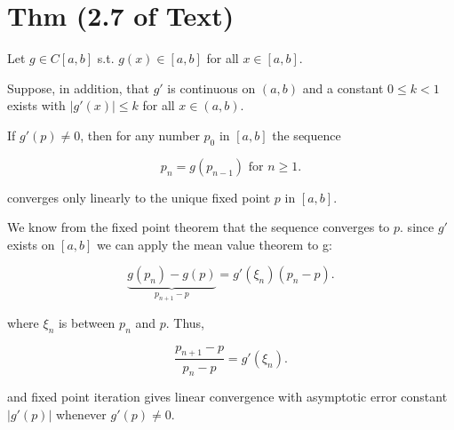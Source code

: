 \documentclass[12pt]{article}
\begin{document}
\section{Thm (2.7 of Text)}

Let $g\in C[a,b]$ s.t. $g(x) \in [a, b]$ for all $x \in [a, b]$.

Suppose, in addition, that $g'$ is continuous on $(a,b)$ and a constant
$0\leq k<1$ exists with $|g'(x)|\leq k$ for all $x\in (a,b)$.

If $g'(p) \neq 0$, then for any number $p_0$ in $[a,b]$ the sequence 

\[
  p_n = g(p_{n-1}) \text{ for } n\geq 1
.\]

converges only linearly to the unique fixed point $p$ in $[a,b]$.

\proof We know from the fixed point theorem that the sequence converges to $p$.
since $g'$ exists on $[a,b]$ we can apply the mean value theorem to g:

\[
\underbrace{g(p_n) - g(p)}_{p_{n+1} - p} = g'(\xi_n)(p_n - p)
.\]

where $\xi_n$ is between $p_n$ and $p$. Thus,

\[
  \frac{p_{n+1}-p}{p_n-p} = g'(\xi_n)
.\]

and fixed point iteration gives linear convergence with asymptotic error
constant $|g'(p)|$ whenever $g'(p) \neq 0$.
\end{document}
